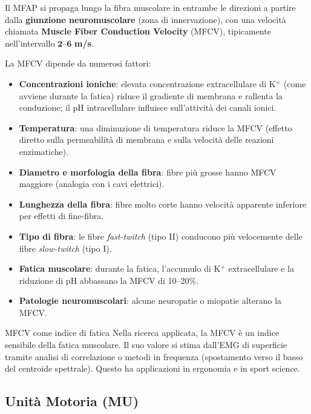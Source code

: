 \begin{definizione}[-- MFCV]
Il MFAP si propaga lungo la fibra muscolare in entrambe le direzioni a partire dalla \textbf{giunzione neuromuscolare} (zona di innervazione), con una velocità chiamata \textbf{Muscle Fiber Conduction Velocity} (MFCV), tipicamente nell'intervallo \(\mathbf{2\text{--}6}\) \textbf{m/s}.
\end{definizione}

La MFCV dipende da numerosi fattori:
\begin{itemize}
    \item \textbf{Concentrazioni ioniche}: elevata concentrazione extracellulare di K\(^+\) (come avviene durante la fatica) riduce il gradiente di membrana e rallenta la conduzione; il pH intracellulare influisce sull'attività dei canali ionici.
    \item \textbf{Temperatura}: una diminuzione di temperatura riduce la MFCV (effetto diretto sulla permeabilità di membrana e sulla velocità delle reazioni enzimatiche).
    \item \textbf{Diametro e morfologia della fibra}: fibre più grosse hanno MFCV maggiore (analogia con i cavi elettrici).
    \item \textbf{Lunghezza della fibra}: fibre molto corte hanno velocità apparente inferiore per effetti di fine-fibra.
    \item \textbf{Tipo di fibra}: le fibre \textit{fast-twitch} (tipo II) conducono più velocemente delle fibre \textit{slow-twitch} (tipo I).
    \item \textbf{Fatica muscolare}: durante la fatica, l'accumulo di K\(^+\) extracellulare e la riduzione di pH abbassano la MFCV di 10--20\%.
    \item \textbf{Patologie neuromuscolari}: alcune neuropatie o miopatie alterano la MFCV.
\end{itemize}

\begin{approfondimento}{MFCV come indice di fatica}
Nella ricerca applicata, la MFCV è un indice sensibile della fatica muscolare. Il suo valore si stima dall'EMG di superficie tramite analisi di correlazione o metodi in frequenza (spostamento verso il basso del centroide spettrale). Questo ha applicazioni in ergonomia e in sport science.
\end{approfondimento}

\subsection{Unità Motoria (MU)}

